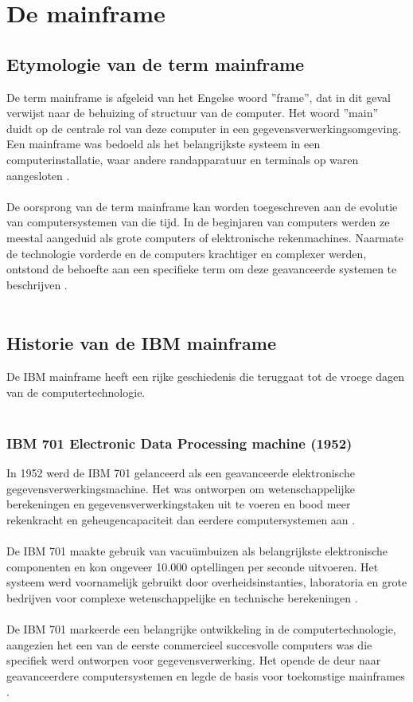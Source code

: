 \section{De mainframe}
\label{sec:de mainframe}

\subsection{Etymologie van de term mainframe}
De term mainframe is afgeleid van het Engelse woord ”frame”, dat in dit geval verwijst naar de behuizing of structuur van de computer. Het woord ”main” duidt op de centrale rol van deze computer in een gegevensverwerkingsomgeving. Een mainframe was bedoeld als het belangrijkste systeem in een computerinstallatie, waar andere randapparatuur en terminals op waren aangesloten \autocite{IBM2024}.
\\ \\
De oorsprong van de term mainframe kan worden toegeschreven aan de evolutie van computersystemen van die tijd. In de beginjaren van computers werden ze meestal aangeduid als grote computers of elektronische rekenmachines. Naarmate de technologie vorderde en de computers krachtiger en complexer werden, ontstond de behoefte aan een specifieke term om deze geavanceerde systemen te beschrijven \autocite{IBM2024}.
\\ \\
\subsection{Historie van de IBM mainframe}
De IBM mainframe heeft een rijke geschiedenis die teruggaat tot de vroege dagen van de computertechnologie.
\\ \\
\subsubsection{IBM 701 Electronic Data Processing machine (1952)}
In 1952 werd de IBM 701 gelanceerd als een geavanceerde elektronische gegevensverwerkingsmachine. Het was ontworpen om wetenschappelijke berekeningen en gegevensverwerkingstaken uit te voeren en bood meer rekenkracht en geheugencapaciteit dan eerdere computersystemen aan \autocite{IBM2024a}.
\\ \\
De IBM 701 maakte gebruik van vacuümbuizen als belangrijkste elektronische componenten en kon ongeveer 10.000 optellingen per seconde uitvoeren. Het systeem werd voornamelijk gebruikt door overheidsinstanties, laboratoria en grote bedrijven voor complexe wetenschappelijke en technische berekeningen \autocite{IBM2024a}.
\\ \\
De IBM 701 markeerde een belangrijke ontwikkeling in de computertechnologie, aangezien het een van de eerste commercieel succesvolle computers was die specifiek werd ontworpen voor gegevensverwerking. Het opende de deur naar geavanceerdere computersystemen en legde de basis voor toekomstige mainframes .
\\ \\

